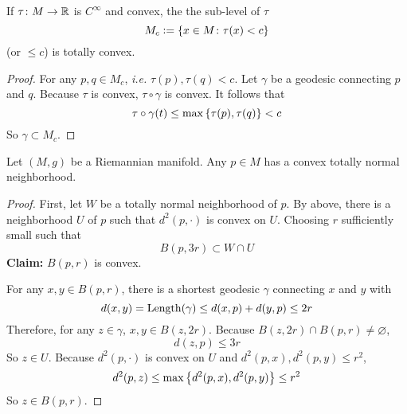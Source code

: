 \begin{enumerate}[label=\arabic{*}.]
	\begin{prop}
		If $\tau \colon M \rightarrow \mathbb{R}$ is $C^\infty$ and convex, the the sub-level of $\tau$
		\begin{equation*}
			M_c \vcentcolon= \left\{x \in M \colon \tau(x) < c\right\}
		\end{equation*}
		(or $\leq c$) is totally convex.
	\end{prop}
	\begin{proof}
		For any $p,q \in M_c$, \emph{i.e.} $\tau(p),\tau(q) < c$. Let $\gamma$ be a geodesic connecting $p$ and $q$. Because $\tau$ is convex, $\tau \circ \gamma$ is convex. It follows that
		\begin{equation*}
			\tau \circ \gamma(t) \leq \max\left\{\tau(p),\tau(q)\right\} < c
		\end{equation*}
		So $\gamma \subset M_c$.
	\end{proof}

	\begin{thm}
		Let $(M,g)$ be a Riemannian manifold. Any $p \in M$ has a convex totally normal neighborhood.
	\end{thm}
	\begin{proof}
		First, let $W$ be a totally normal neighborhood of $p$. By above, there is a neighborhood $U$ of $p$ such that $d^2(p,\cdot)$ is convex on $U$. Choosing $r$ sufficiently small such that
		\begin{equation*}
			B(p,3r) \subset W\cap U
		\end{equation*}
		\textbf{Claim:} $B(p,r)$ is convex.

		\noindent For any $x,y \in B(p,r)$, there is a shortest geodesic $\gamma$ connecting $x$ and $y$ with
		\begin{equation*}
			d(x,y) = \operatorname{Length}(\gamma) \leq d(x,p)+d(y,p) \leq 2r
		\end{equation*}
		Therefore, for any $z \in \gamma$, $x,y \in B(z,2r)$. Because $B(z,2r) \cap B(p,r) \neq \varnothing$,
		\begin{equation*}
			d(z,p) \leq 3r
		\end{equation*}
		So $z \in U$. Because $d^2(p,\cdot)$ is convex on $U$ and $d^2(p,x),d^2(p,y) \leq r^2$,
		\begin{equation*}
			d^2(p,z) \leq \max\left\{d^2(p,x),d^2(p,y)\right\} \leq r^2
		\end{equation*}
		So $z \in B(p,r)$.
	\end{proof}
\end{enumerate}



















